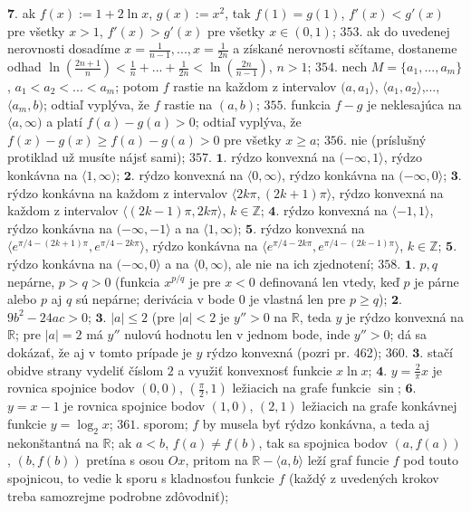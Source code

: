 $\boldsymbol{7.}$ ak  $f(x):=1+2\ln x$, $g(x):=x^{2}$, tak $f(1)=g(1)$, $f'(x)<g'(x)$ pre všetky $x>1$, $f'(x)>g'(x)$ pre všetky $x\in(0,1)$;
$\boxed{353.}$ ak do uvedenej nerovnosti dosadíme $x=\frac{1}{n-1},...,x=\frac{1}{2n}$ a získané nerovnosti sčítame, dostaneme odhad $\ln (\frac{2n+1}{n})<\frac{1}{n}+...+\frac{1}{2n}<\ln (\frac{2n}{n-1}) $, $n>1$;
$\boxed{354.}$ nech $M=\lbrace a_{1},...,a_{m} \rbrace$, $a_{1}<a_{2}<...<a_{m}$; potom $f$ rastie na každom z intervalov  $(a,a_{1} \rangle$, $\langle a_{1},a_{2} \rangle$,..., $\langle a_{m},b)$; odtiaľ vyplýva, že $f$ rastie na $(a,b)$;
$\boxed{355.}$ funkcia $f-g$ je neklesajúca na $\langle a, \infty)$ a platí $f(a)-g(a)>0$; odtiaľ vyplýva, že $f(x)-g(x)\geq f(a)-g(a)>0$ pre všetky $x\geq a$;
$\boxed{356.}$ nie (príslušný protiklad už musíte nájsť sami);
$\boxed{357.}$ $\boldsymbol{1.}$ rýdzo konvexná na $(-\infty ,1\rangle$, rýdzo konkávna na $\langle 1, \infty)$;
$\boldsymbol{2.}$ rýdzo konvexná na $\langle 0, \infty)$, rýdzo konkávna na $(-\infty ,0\rangle$;
$\boldsymbol{3.}$ rýdzo konkávna na každom z intervalov $\langle 2k\pi, (2k+1)\pi \rangle$, rýdzo konvexná na  každom z intervalov $\langle (2k-1)\pi, 2k\pi \rangle$, $k\in \mathbb{Z}$;
$\boldsymbol{4.}$ rýdzo konvexná na $\langle -1,1 \rangle$, rýdzo konkávna na $(-\infty ,-1\rangle$ a na $\langle  1,\infty )$; 
$\boldsymbol{5.}$ rýdzo konvexná na $\langle e^{\pi/4-(2k+1)\pi},e^{\pi/4-2k\pi} \rangle$, rýdzo konkávna na $\langle e^{\pi/4-2k\pi},e^{\pi/4-(2k-1)\pi} \rangle$, $k\in \mathbb{Z}$;
$\boldsymbol{5.}$ rýdzo konkávna na $(-\infty ,0\rangle$ a na $\langle 0, \infty)$, ale nie na ich zjednotení;
$\boxed{358.}$ $\boldsymbol{1.}$ $p,q$ nepárne, $p>q>0$ (funkcia $x^{p/q}$ je pre $x<0$ definovaná len vtedy, keď $p$ je párne alebo $p$ aj $q$ sú nepárne; derivácia v bode $0$ je vlastná len pre $p\geq q$);
$\boldsymbol{2.}$ $9b^{2}-24ac>0$;
$\boldsymbol{3.}$ $\vert a \vert \leq 2$ (pre $\vert a \vert < 2$ je  $y''>0$ na $\mathbb{R}$, teda $y$ je rýdzo konvexná na $\mathbb{R}$; pre  $\vert a \vert =2$ má $y''$ nulovú hodnotu len v jednom bode, inde $y''>0$; dá sa dokázať, že aj v tomto prípade je  $y$ rýdzo konvexná (pozri pr. 462);
$\boxed{360.}$ $\boldsymbol{3.}$ stačí obidve strany vydeliť číslom $2$ a využiť konvexnosť funkcie $x \ln x$;
$\boldsymbol{4.}$ $y=\frac{2}{\pi}x$ je rovnica spojnice bodov $(0,0)$, $(\frac{\pi}{2},1)$ ležiacich na grafe funkcie $\sin $;
$\boldsymbol{6.}$ $y=x-1$ je rovnica spojnice bodov $(1,0)$, $(2,1)$ ležiacich na grafe konkávnej funkcie $y=\log _{2}x $;
$\boxed{361.}$ sporom; $f$ by musela byť rýdzo konkávna, a teda aj nekonštantná na $\mathbb{R}$; ak $a < b$, $f(a)\ne  f(b)$, tak sa spojnica bodov $(a,f(a))$, $(b,f(b))$ pretína s osou $Ox$, pritom na $\mathbb{R}-\langle a,b \rangle$ leží graf funcie $f$ pod touto spojnicou, to vedie k sporu s kladnosťou funkcie $f$ (každý z uvedených krokov treba samozrejme podrobne zdôvodniť);
